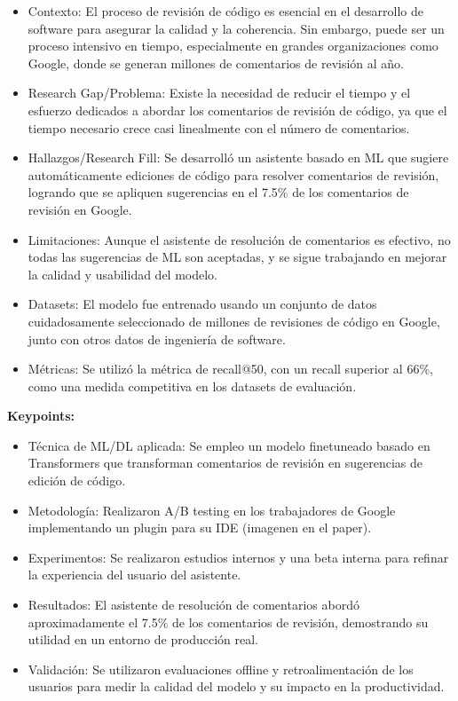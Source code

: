 \documentclass{article}
\begin{document}
\begin{itemize}
    \item Contexto: El proceso de revisión de código es esencial en el desarrollo de software para asegurar la calidad y la coherencia. Sin embargo, puede ser un proceso intensivo en tiempo, especialmente en grandes organizaciones como Google, donde se generan millones de comentarios de revisión al año.
    \item Research Gap/Problema: Existe la necesidad de reducir el tiempo y el esfuerzo dedicados a abordar los comentarios de revisión de código, ya que el tiempo necesario crece casi linealmente con el número de comentarios.
    \item Hallazgos/Research Fill: Se desarrolló un asistente basado en ML que sugiere automáticamente ediciones de código para resolver comentarios de revisión, logrando que se apliquen sugerencias en el 7.5\% de los comentarios de revisión en Google.
    \item Limitaciones: Aunque el asistente de resolución de comentarios es efectivo, no todas las sugerencias de ML son aceptadas, y se sigue trabajando en mejorar la calidad y usabilidad del modelo.
    \item Datasets: El modelo fue entrenado usando un conjunto de datos cuidadosamente seleccionado de millones de revisiones de código en Google, junto con otros datos de ingeniería de software.
    \item Métricas: Se utilizó la métrica de recall@50, con un recall superior al 66\%, como una medida competitiva en los datasets de evaluación.
\end{itemize}

\textbf{Keypoints:}

\begin{itemize}
    \item Técnica de ML/DL aplicada: Se empleo un modelo finetuneado basado en Transformers que transforman comentarios de revisión en sugerencias de edición de código.
    \item Metodología: Realizaron A/B testing en los trabajadores de Google implementando un plugin para su IDE (imagenen en el paper).
    \item Experimentos: Se realizaron estudios internos y una beta interna para refinar la experiencia del usuario del asistente.
    \item Resultados: El asistente de resolución de comentarios abordó aproximadamente el 7.5\% de los comentarios de revisión, demostrando su utilidad en un entorno de producción real.
    \item Validación: Se utilizaron evaluaciones offline y retroalimentación de los usuarios para medir la calidad del modelo y su impacto en la productividad.
\end{itemize}
\end{document}
